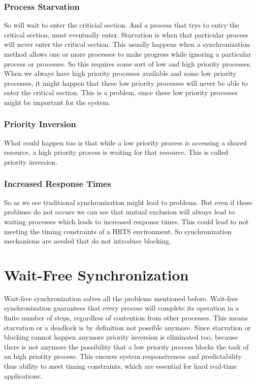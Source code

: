 \subsubsection{Process Starvation}\label{subsubsec:process-starvation}

So will wait to enter the criticial section. And a process that trys to entry the critical section, must eventually enter. Starvation is when that particular process will never enter the critical section. This usually happens when a synchronization method allows one or more processes to make progress while ignoring a particular process or processes. So this requires some sort of low and high priority processes. When we always have high priority processes available and some low priority processes, it might happen that these low priority processes will never be able to enter the critical section. This is a problem, since these low priority processes might be important for the system. \cite{Starvation}

\subsubsection{Priority Inversion}\label{subsubsec:priority-inversion}

What could happen too is that while a low priority process is accessing a shared resource, a high priority process is waiting for that resource. This is called priority inversion. \cite{priorityInversion}

\subsubsection{Increased Response Times}\label{subsubsec:increased-response-times}

So as we see traditional synchronization might lead to problems. But even if these problmes do not occure we can see that mutual exclusion will always lead to waiting processes which leads to increased response times. This could lead to not meeting the timing constraints of a \ac{HRTS} environment. So synchronization mechanisms are needed that do not introduce blocking.

\section{Wait-Free Synchronization}\label{sec:wait-free}

Wait-free synchronization solves all the problems mentioned before. Wait-free synchronization guarantees that every process will complete its operation in a finite number of steps, regardless of contention from other processes. This means starvation or a deadlock is by definition not possible anymore. Since starvation or blocking cannot happen anymore priority inversion is eliminated too, because there is not anymore the possibility that a low priority process blocks the task of an high priority process. This ensures system responsiveness and predictability thus ability to meet timing constraints, which are essential for hard real-time applications. 

